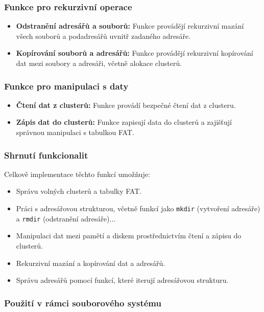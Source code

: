 \documentclass[12pt]{article}
\begin{document}
\subsubsection*{Funkce pro rekurzivní operace}
\begin{itemize}
    \item \textbf{Odstranění adresářů a souborů:} Funkce provádějí rekurzivní mazání všech souborů a podadresářů uvnitř zadaného adresáře.
    \item \textbf{Kopírování souborů a adresářů:} Funkce provádějí rekurzivní kopírování dat mezi soubory a adresáři, včetně alokace clusterů.
\end{itemize}

\subsubsection*{Funkce pro manipulaci s daty}
\begin{itemize}
    \item \textbf{Čtení dat z clusterů:} Funkce provádí bezpečné čtení dat z clusteru.
    \item \textbf{Zápis dat do clusterů:} Funkce zapisují data do clusterů a zajišťují správnou manipulaci s tabulkou FAT.
\end{itemize}

\subsubsection*{Shrnutí funkcionalit}

Celkově implementace těchto funkcí umožňuje:

\begin{itemize}
    \item Správu volných clusterů a tabulky FAT.
    \item Práci s adresářovou strukturou, včetně funkcí jako \texttt{mkdir} (vytvoření adresáře) a \texttt{rmdir} (odstranění adresáře)...
    \item Manipulaci dat mezi pamětí a diskem prostřednictvím čtení a zápisu do clusterů.
    \item Rekurzivní mazání a kopírování dat a adresářů.
    \item Správu adresářů pomocí funkcí, které iterují adresářovou strukturu.
\end{itemize}

\subsubsection*{Použití v rámci souborového systému}
\end{document}
